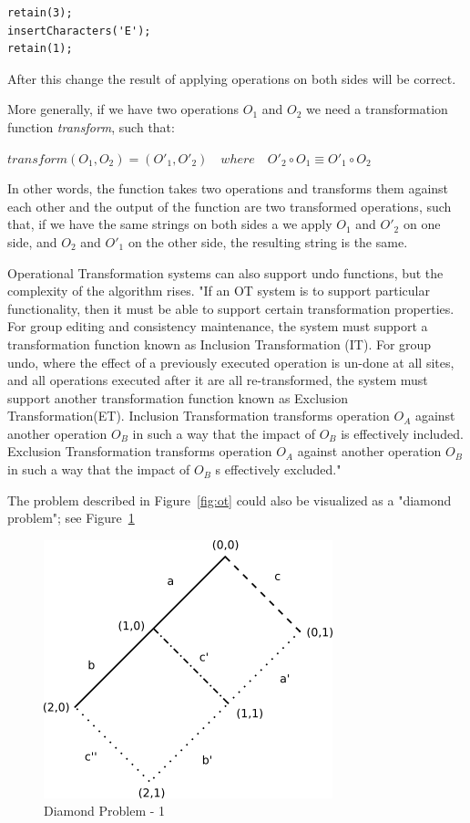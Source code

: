 \documentclass[12pt,oneside]{fithesis2}
\begin{document}
\vspace{3mm}
\begin{verbatim}
retain(3);
insertCharacters('E');
retain(1);
\end{verbatim}
\vspace{3mm}
After this change the result of applying operations on both sides will be correct.\par More generally, if we have two operations \(O_{1}\) and  \(O_{2}\) we need a transformation function \textit{transform}, such that: 
\begin{center}
\(transform(O_{1},O_{2}) = (O'_{1},O'_{2}) \quad where \quad O'_{2} \circ O_{1} \equiv O'_{1} \circ O_{2} \) 
\end{center}
In other words, the function takes two operations and transforms them against each other and the output of the function are two transformed operations, such that, if we have the same strings on both sides a we apply \( O_{1} \) and \(O'_{2}\) on one side, and \( O_{2} \) and  \( O'_{1} \) on the other side, the resulting string is the same. 
\par Operational Transformation systems can also support undo functions, but the complexity of the algorithm rises. "If an OT system is to support particular functionality, then it must be able to support certain transformation properties. For group editing and consistency maintenance, the system must support a transformation function known as Inclusion Transformation (IT). For group undo, where the effect of a previously executed operation is un-done at all sites, and all operations executed after it are all re-transformed, the system must support another transformation function known as Exclusion Transformation(ET). Inclusion Transformation transforms operation \( O_{A} \) against another operation \( O_{B} \) in such a way that the impact of \( O_{B} \) is effectively included. Exclusion Transformation transforms operation \( O_{A} \) against another operation \( O_{B} \) in such a way that the impact of \( O_{B} \) s effectively excluded." \cite{Leung} 
\par The problem described in Figure~\ref{fig:ot} could also be visualized as a "diamond problem"; see Figure~\ref{fig:diamond1}
\begin{figure}[H]
\caption{Diamond Problem - 1}
\label{fig:diamond1}
\centering
\vspace{5mm}
\includegraphics{diamond1}
\end{figure}
\end{document}
